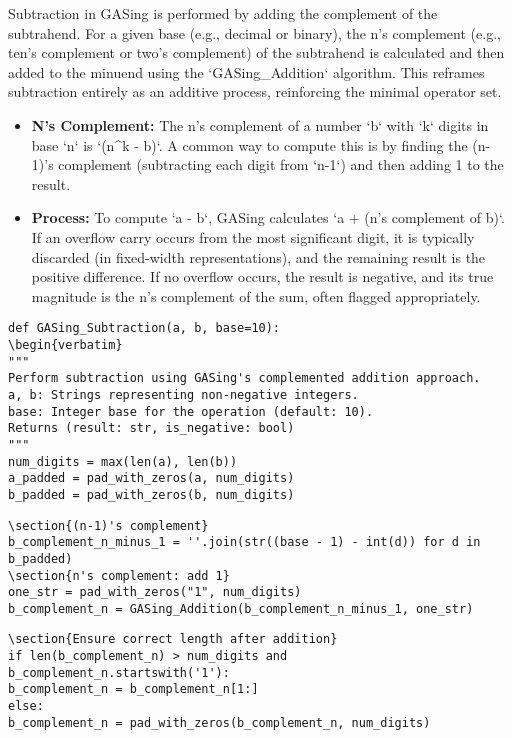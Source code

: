 Subtraction in GASing is performed by adding the complement of the subtrahend. For a given base (e.g., decimal or binary), the n's complement (e.g., ten's complement or two's complement) of the subtrahend is calculated and then added to the minuend using the `GASing_Addition` algorithm. This reframes subtraction entirely as an additive process, reinforcing the minimal operator set.
\begin{itemize}
\item \textbf{N's Complement:} The n's complement of a number `b` with `k` digits in base `n` is `(n^k - b)`. A common way to compute this is by finding the (n-1)'s complement (subtracting each digit from `n-1`) and then adding 1 to the result.
\item \textbf{Process:} To compute `a - b`, GASing calculates `a + (n's complement of b)`. If an overflow carry occurs from the most significant digit, it is typically discarded (in fixed-width representations), and the remaining result is the positive difference. If no overflow occurs, the result is negative, and its true magnitude is the n's complement of the sum, often flagged appropriately.

\end{itemize}
\begin{verbatim}
def GASing_Subtraction(a, b, base=10):
\begin{verbatim}
"""
Perform subtraction using GASing's complemented addition approach.
a, b: Strings representing non-negative integers.
base: Integer base for the operation (default: 10).
Returns (result: str, is_negative: bool)
"""
num_digits = max(len(a), len(b))
a_padded = pad_with_zeros(a, num_digits)
b_padded = pad_with_zeros(b, num_digits)
\end{verbatim}

\begin{verbatim}
\section{(n-1)'s complement}
b_complement_n_minus_1 = ''.join(str((base - 1) - int(d)) for d in b_padded)
\section{n's complement: add 1}
one_str = pad_with_zeros("1", num_digits)
b_complement_n = GASing_Addition(b_complement_n_minus_1, one_str)
\end{verbatim}

\begin{verbatim}
\section{Ensure correct length after addition}
if len(b_complement_n) > num_digits and b_complement_n.startswith('1'):
b_complement_n = b_complement_n[1:]
else:
b_complement_n = pad_with_zeros(b_complement_n, num_digits)
\end{verbatim}

